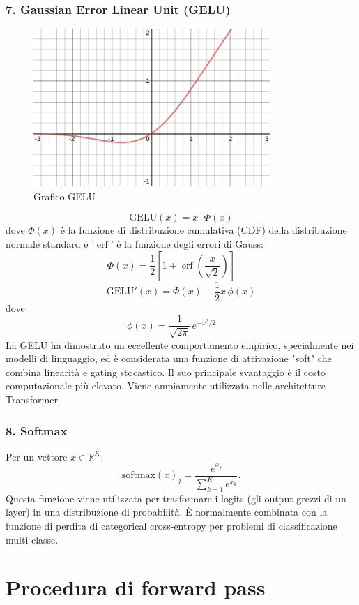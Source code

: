 \documentclass[a4paper,12pt]{report}
\begin{document}
	\subsubsection{7. Gaussian Error Linear Unit (GELU)}
	\begin{figure}[H]
		\centering
		\includegraphics[width=0.8\textwidth]{img/gelu.png}
		\caption{Grafico GELU}
	\end{figure}
	\[
	\mathrm{GELU}(x) = x \cdot \Phi(x)
	\]
	dove $\Phi(x)$ è la funzione di distribuzione cumulativa (CDF) della distribuzione normale standard e '$\operatorname{erf}$' è la funzione degli errori di Gauss:
	\[
	\Phi(x) = \frac{1}{2} \left[ 1 + \operatorname{erf} \left( \frac{x}{\sqrt{2}} \right) \right] \qquad
	\]
	\[
	\mathrm{GELU}'(x) = \Phi(x) + \frac{1}{2}x\,\phi(x)
	\]
	dove
	\[
	\phi(x) = \frac{1}{\sqrt{2\pi}}\,e^{-x^{2}/2} \qquad
	\]
	La GELU ha dimostrato un eccellente comportamento empirico, specialmente nei modelli di linguaggio, ed è considerata una funzione di attivazione "soft" che combina linearità e gating stocastico. Il suo principale svantaggio è il costo computazionale più elevato. Viene ampiamente utilizzata nelle architetture Transformer.
	
	\subsubsection{8. Softmax}
	Per un vettore $x\in\mathbb{R}^K$:
	\[
	\mathrm{softmax}(x)_j=\frac{e^{x_j}}{\sum_{k=1}^K e^{x_k}}.
	\]
	Questa funzione viene utilizzata per trasformare i logits (gli output grezzi di un layer) in una distribuzione di probabilità. È normalmente combinata con la funzione di perdita di categorical cross-entropy per problemi di classificazione multi-classe.
	
	\section{Procedura di forward pass}
	
\end{document}
